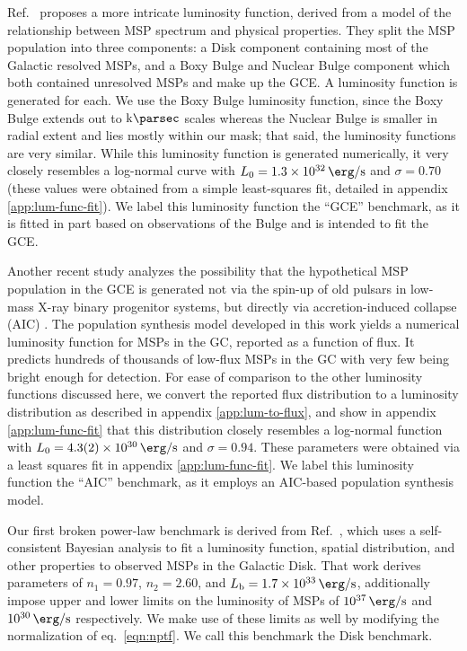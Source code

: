 \documentclass[letter,11pt]{article}
\begin{document}
Ref.~\cite{Ploeg:2020jeh} proposes a more intricate luminosity function, derived from a model of the relationship between MSP spectrum and physical properties. They split the MSP population into three components: a Disk component containing most of the Galactic resolved MSPs, and a Boxy Bulge and Nuclear Bulge component which both contained unresolved MSPs and make up the GCE. A luminosity function is generated for each. We use the Boxy Bulge luminosity function, since the Boxy Bulge extends out to $\SI{}{\kilo\parsec}$ scales whereas the Nuclear Bulge is smaller in radial extent and lies mostly within our mask; that said, the luminosity functions are very similar.  While this luminosity function is generated numerically, it very closely resembles a log-normal curve with $L_0 = \SI{1.3e32}{\erg\per\second}$ and $\sigma=0.70$ (these values were obtained from a simple least-squares fit, detailed in appendix \ref{app:lum-func-fit}). We label this luminosity function the ``GCE'' benchmark, as it is fitted in part based on observations of the Bulge and is intended to fit the GCE.

Another recent study analyzes the possibility that the hypothetical MSP population in the GCE is generated not via the spin-up of old pulsars in low-mass X-ray binary progenitor systems, but directly via accretion-induced collapse (AIC) \cite{Gautam:2021wqn}. The population synthesis model developed in this work yields a numerical luminosity function for MSPs in the GC, reported as a function of flux. It predicts hundreds of thousands of low-flux MSPs in the GC with very few being bright enough for detection. For ease of comparison to the other luminosity functions discussed here, we convert the reported flux distribution to a luminosity distribution as described in appendix \ref{app:lum-to-flux}, and show in appendix \ref{app:lum-func-fit} that this distribution closely resembles a log-normal function with $L_0 = \SI{4.3 \pm 0.2e+30}{\erg\per\second}$ and $\sigma = 0.94$. These parameters were obtained via a least squares fit in appendix \ref{app:lum-func-fit}. We label this luminosity function the ``AIC'' benchmark, as it employs an AIC-based population synthesis model.

Our first broken power-law benchmark is derived from Ref.~\cite{Bartels:2018xom}, which uses a self-consistent Bayesian analysis to fit a luminosity function, spatial distribution, and other properties to observed MSPs in the Galactic Disk. That work derives parameters of $n_1=0.97$, $n_2=2.60$, and $L_\text{b}=\SI{1.7e33}{\erg\per\second}$, additionally impose upper and lower limits on the luminosity of MSPs of $\SI{e37}{\erg\per\second}$ and $\SI{e30}{\erg\per\second}$ respectively. We make use of these limits as well by modifying the normalization of eq.~\ref{eqn:nptf}. We call this benchmark the Disk benchmark.
\end{document}
